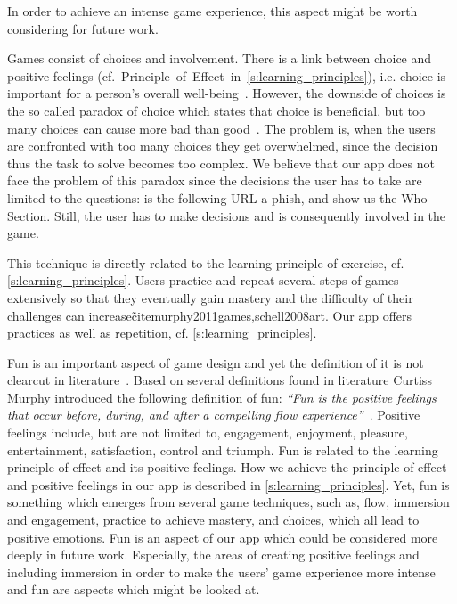\begin{description}[leftmargin=0cm]
In order to achieve an intense game experience, this aspect might be worth considering for future work.
	\item[Choice and Involvement:]
Games consist of choices and involvement. 
There is a link between choice and positive feelings (cf.~Principle~of~Effect~in~\autoref{s:learning_principles}), i.e. choice is important for a person's overall well-being~\cite{seligman2012flourish, schwartz2009paradox}.
However, the downside of choices is the so called paradox of choice which states that choice is beneficial, but too many choices can cause more bad than good~\cite{schwartz2009paradox}.
The problem is, when the users are confronted with too many choices they get overwhelmed, since the decision thus the task to solve becomes too complex.
We believe that our app does not face the problem of this paradox since the decisions the user has to take are limited to the questions:
is the following URL a phish, and show us the Who-Section.
Still, the user has to make decisions and is consequently involved in the game.
	\item[Practice:] This technique is directly related to the learning principle of exercise, cf. \autoref{s:learning_principles}. 
Users practice and repeat several steps of games extensively so that they eventually gain mastery and the difficulty of their challenges can increase\~cite{murphy2011games,schell2008art}. 
Our app offers practices as well as repetition, cf. \autoref{s:learning_principles}.
	\item[Fun:] Fun is an important aspect of game design and yet the definition of it is not clearcut in literature~\cite{murphy2011games, schell2008art,koster2010theory}.
Based on several definitions found in literature Curtiss Murphy introduced the following definition of fun: \textit{``Fun is the positive feelings that occur before, during, and after a compelling flow experience''}~\cite{murphy2011games}.
Positive feelings include, but are not limited to, engagement, enjoyment, pleasure, entertainment, satisfaction, control and triumph. 
Fun is related to the learning principle of effect and its positive feelings.
How we achieve the principle of effect and positive feelings in our app is described in \autoref{s:learning_principles}.
Yet, fun is something which emerges from several game techniques, such as, flow, immersion and engagement, practice to achieve mastery, and choices, which all lead to positive emotions.
Fun is an aspect of our app which could be considered more deeply in future work. 
Especially, the areas of creating positive feelings and including immersion in order to make the users' game experience more intense and fun are aspects which might be looked at.
\end{description}